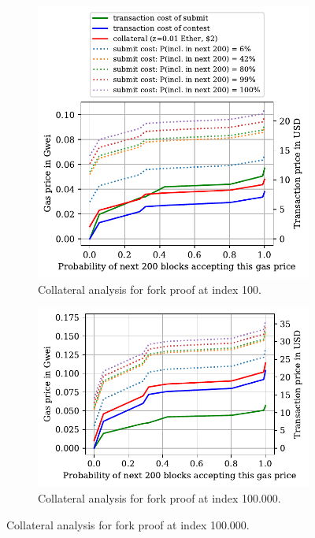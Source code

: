 \begin{figure}[!h]
\begin{subfigure}{0.9\linewidth}
    \begin{center}
        \includegraphics[width=1\columnwidth]{figures/cryptoeconomics-100.pdf}
    \end{center}
    \caption{Collateral analysis for fork proof at index 100.}
    \label{fig:cryptoeconomics-100}
\end{subfigure}

\begin{subfigure}{0.9\linewidth}
    \begin{center}
        \includegraphics[width=1\columnwidth]{figures/cryptoeconomics-100K.pdf}
    \end{center}
    \caption{Collateral analysis for fork proof at index 100.000.}
    \label{fig:cryptoeconomics-100K}
\end{subfigure}


\end{figure}
